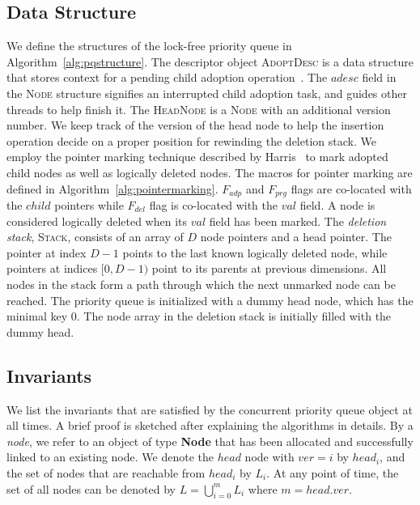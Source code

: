 \documentclass[10pt,journal,letter,compsoc]{IEEEtran}
\begin{document}
\vspace{-0.08in}
\subsection{Data Structure}
We define the structures of the lock-free priority queue in Algorithm~\ref{alg:pqstructure}. 
The descriptor object \textsc{AdoptDesc} is a data structure that stores context for a pending child adoption operation~\cite{herlihy2012art}.
The $adesc$ field in the \textsc{Node} structure signifies an interrupted child adoption task, and guides other threads to help finish it.
The \textsc{HeadNode} is a \textsc{Node} with an additional version number. 
We keep track of the version of the head node to help the insertion operation decide on a proper position for rewinding the deletion stack.
We employ the pointer marking technique described by Harris~\cite{harris2001pragmatic} to mark adopted child nodes as well as logically deleted nodes. 
The macros for pointer marking are defined in Algorithm~\ref{alg:pointermarking}.
$F_{adp}$ and $F_{prg}$ flags are co-located with the $child$ pointers while $F_{del}$ flag is co-located with the $val$ field.
A node is considered logically deleted when its $val$ field has been marked. 
The \emph{deletion stack}, \textsc{Stack}, consists of an array of $D$ node pointers and a head pointer.
The pointer at index $D-1$ points to the last known logically deleted node, while pointers at indices $[0, D-1)$ point to its parents at previous dimensions.
All nodes in the stack form a path through which the next unmarked node can be reached.
The priority queue is initialized with a dummy head node, which has the minimal key 0.
The node array in the deletion stack is initially filled with the dummy head.


\vspace{-0.08in}
\subsection{Invariants}
\label{sec:inv}
We list the invariants that are satisfied by the concurrent priority queue object at all times. 
A brief proof is sketched after explaining the algorithms in details. 
By a \emph{node}, we refer to an object of type \textbf{Node} that has been allocated and successfully linked to an existing node. 
We denote the $head$ node with $ver=i$ by $head_i$, and the set of nodes that are reachable from $head_i$ by $L_i$. 
At any point of time, the set of all nodes can be denoted by $L=\bigcup_{i=0}^{m}L_i$ where $m = head.ver$.
\end{document}
